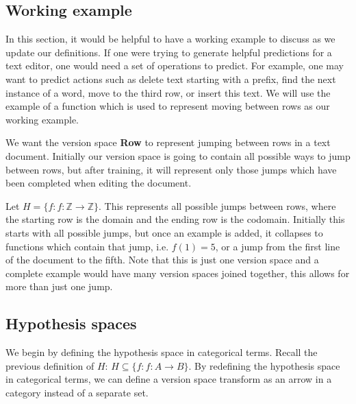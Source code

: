 \documentclass{article}
\theoremstyle{definition}
\begin{document}
\subsection{Working example}
In this section, it would be helpful to have a working example to discuss as we update our definitions. If one were trying to generate helpful predictions for a text editor, one would need a set of operations to predict. For example, one may want to predict actions such as delete text starting with a prefix, find the next instance of a word, move to the third row, or insert this text. We will use the example of a function which is used to represent moving between rows as our working example. 

We want the version space \textbf{Row} to represent jumping between rows in a text document. Initially our version space is going to contain all possible ways to jump between rows, but after training, it will represent only those jumps which have been completed when editing the document. 

Let $H = \{f: f: \mathbb{Z} \rightarrow \mathbb{Z}\}$. This represents all possible jumps between rows, where the starting row is the domain and the ending row is the codomain. Initially this starts with all possible jumps, but once an example is added, it collapses to functions which contain that jump, i.e. $f(1) = 5$, or a jump from the first line of the document to the fifth. Note that this is just one version space and a complete example would have many version spaces joined together, this allows for more than just one jump. 


\subsection{Hypothesis spaces}
We begin by defining the hypothesis space in categorical terms. Recall the previous definition of $H$: $H\subseteq \{f: f: A \rightarrow B\}$.
By redefining the hypothesis space in categorical terms, we can define a version space transform as an arrow in a category instead of a separate set. 
\end{document}
